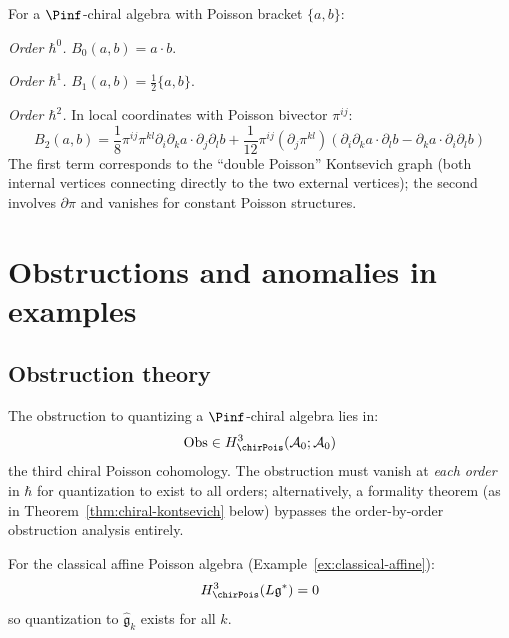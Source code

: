 \begin{computation}\label{comp:star-order-2}
For a $\Pinf$-chiral algebra with Poisson bracket $\{a, b\}$:

\emph{Order $\hbar^0$.} $B_0(a, b) = a \cdot b$.

\emph{Order $\hbar^1$.} $B_1(a, b) = \frac{1}{2}\{a, b\}$.

\emph{Order $\hbar^2$.} In local coordinates with Poisson bivector $\pi^{ij}$:
\[
B_2(a, b) = \frac{1}{8}\pi^{ij}\pi^{kl}\partial_i\partial_k a \cdot \partial_j\partial_l b + \frac{1}{12}\pi^{ij}(\partial_j\pi^{kl})(\partial_i\partial_k a \cdot \partial_l b - \partial_k a \cdot \partial_i\partial_l b)
\]
The first term corresponds to the ``double Poisson'' Kontsevich graph (both internal vertices connecting directly to the two external vertices); the second involves $\partial\pi$ and vanishes for constant Poisson structures.
\end{computation}


\section{Obstructions and anomalies in examples}
\label{sec:obstructions}

\subsection{Obstruction theory}

\begin{theorem}\label{thm:obstructions}
The obstruction to quantizing a $\Pinf$-chiral algebra lies in:
\[
\mathrm{Obs} \in H^3_{\chirPois}(\mathcal{A}_0; \mathcal{A}_0)
\]
the third chiral Poisson cohomology. The obstruction must vanish at
\emph{each order} in $\hbar$ for quantization to exist to all orders; alternatively,
a formality theorem (as in Theorem~\ref{thm:chiral-kontsevich} below) bypasses the
order-by-order obstruction analysis entirely.
\end{theorem}

\begin{example}\label{ex:no-obs-affine}
For the classical affine Poisson algebra (Example~\ref{ex:classical-affine}):
\[
H^3_{\chirPois}(L\mathfrak{g}^*) = 0
\]
so quantization to $\hat{\mathfrak{g}}_k$ exists for all $k$.
\end{example}


